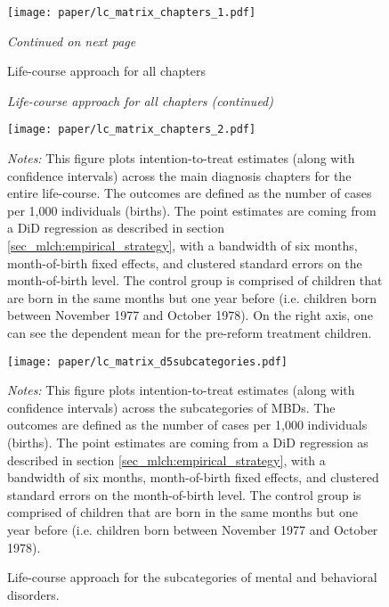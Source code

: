 
\begin{figure}[H]\centering
	\caption{Life-course approach for all chapters}\label{fig_mlch: appendix_lc_matrix_chapters}
	\texttt{[image: paper/lc\_matrix\_chapters\_1.pdf]}
		\scriptsize
		\begin{minipage}{\linewidth}
			\emph{Continued on next page}
		\end{minipage}
\end{figure}

\begin{figure}[H]\centering
		\begin{minipage}{\linewidth}\scriptsize
		\begin{center} \emph{Life-course approach for all chapters (continued)}\end{center}
	\end{minipage}
	\texttt{[image: paper/lc\_matrix\_chapters\_2.pdf]}
		\begin{minipage}{\linewidth}
		\scriptsize \emph{Notes:} This figure plots intention-to-treat estimates (along with confidence intervals) across the main diagnosis chapters for the entire life-course. The outcomes are defined as the number of cases per 1,000 individuals (births). The point estimates are coming from a DiD regression as described in section \ref{sec_mlch:empirical_strategy}, with a bandwidth of six months, month-of-birth fixed effects, and clustered standard errors on the month-of-birth level. The control group is comprised of children that are born in the same months but one year before (i.e. children born between November 1977 and October 1978). On the right axis, one can see the dependent mean for the pre-reform treatment children.
	\end{minipage}
\end{figure}
\begin{figure}[H]\centering
	\caption{Life-course approach for the subcategories of mental and behavioral disorders.}\label{fig_mlch: appendix_lc_matrix_d5_subcateg}
	\texttt{[image: paper/lc\_matrix\_d5subcategories.pdf]}
		\begin{minipage}{\linewidth}
		\scriptsize \emph{Notes:} This figure plots intention-to-treat estimates (along with confidence intervals) across the subcategories of MBDs. The outcomes are defined as the number of cases per 1,000 individuals (births). The point estimates are coming from a DiD regression as described in section \ref{sec_mlch:empirical_strategy}, with a bandwidth of six months, month-of-birth fixed effects, and clustered standard errors on the month-of-birth level. The control group is comprised of children that are born in the same months but one year before (i.e. children born between November 1977 and October 1978).
	\end{minipage}
\end{figure}

